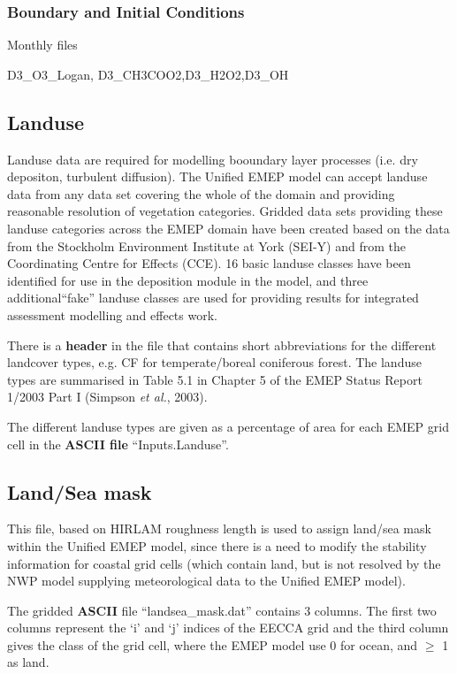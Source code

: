 \subsubsection{Boundary and Initial Conditions}

Monthly files

D3\_O3\_Logan, D3\_CH3COO2,D3\_H2O2,D3\_OH

\subsection{Landuse}

Landuse data are required for modelling booundary layer processes
(i.e. dry depositon, turbulent diffusion).
The Unified EMEP model can accept landuse data from any
data set covering the whole of the domain and providing reasonable 
resolution of vegetation categories. Gridded data sets providing
these landuse categories across the EMEP domain have been created
based on the data from the Stockholm Environment Institute at York 
(SEI-Y) and from the Coordinating Centre for Effects (CCE). 
16 basic landuse classes have been identified for use in the
deposition module in the model, and three additional``fake'' landuse
classes are used for providing results for integrated assessment
modelling and effects work.

There is a {\bf header} in the file that contains short abbreviations 
for the different landcover
types, e.g. CF for temperate/boreal coniferous forest. The landuse
types are summarised in Table 5.1 in Chapter 5 of the EMEP Status
Report 1/2003 Part I (Simpson {\sl et al.}, 2003).

The different landuse types are given as a percentage of area for each 
EMEP grid cell in the {\bf ASCII file} ``Inputs.Landuse''. 



\subsection{Land/Sea mask}
This file, based on HIRLAM roughness length is used
to assign land/sea mask within the Unified EMEP model, since there is
a need to modify the stability information for coastal grid cells
(which contain land, but is not resolved by the NWP model supplying 
meteorological data to the Unified EMEP model). 

The gridded {\bf ASCII} file ``landsea\_mask.dat'' contains 3 columns. 
The first two columns represent the `i' and `j' indices of the EECCA
grid and the third column gives the class of the grid cell, where the 
EMEP model use 0 for ocean, and $\geq$ 1 as land.%

